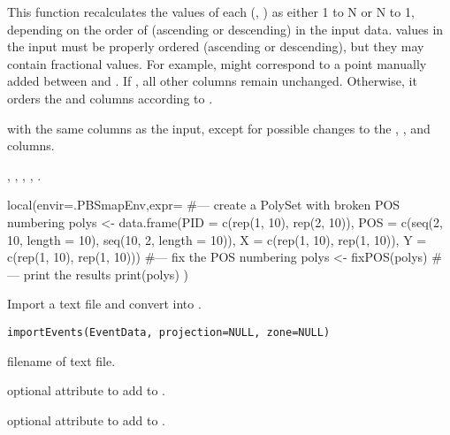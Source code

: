 \documentclass[letterpaper]{book}
\begin{document}
%
\begin{Details}\relax
This function recalculates the  values of each (,
) as either 1 to N or N to 1, depending on the order of
 (ascending or descending) in the input data.  
values in the input must be properly ordered (ascending or
descending), but they may contain fractional values.  For example,
 might correspond to a point manually added between
 and .  If , all
other columns remain unchanged.  Otherwise, it orders the  and
 columns according to .
\end{Details}
%
\begin{Value}
 with the same columns as the input, except for possible
changes to the , , and  columns.
\end{Value}
%
\begin{SeeAlso}\relax
{},
,
,
,
.
\end{SeeAlso}
%
\begin{Examples}
\begin{ExampleCode}
local(envir=.PBSmapEnv,expr={
  #--- create a PolySet with broken POS numbering
  polys <- data.frame(PID = c(rep(1, 10), rep(2, 10)),
    POS = c(seq(2, 10, length = 10), seq(10, 2, length = 10)),
    X = c(rep(1, 10), rep(1, 10)),
    Y = c(rep(1, 10), rep(1, 10)))
  #--- fix the POS numbering
  polys <- fixPOS(polys)
  #--- print the results
  print(polys)
})
\end{ExampleCode}
\end{Examples}
%
\begin{Description}\relax
Import a text file and convert into .
\end{Description}
%
\begin{Usage}
\begin{verbatim}
importEvents(EventData, projection=NULL, zone=NULL)
\end{verbatim}
\end{Usage}
%
\begin{Arguments}
\begin{ldescription}
\item[\code{EventData}] filename of  text file.
\item[\code{projection}] optional  attribute to add to .
\item[\code{zone}] optional  attribute to add to .

\end{ldescription}
\end{Arguments}
\end{document}
